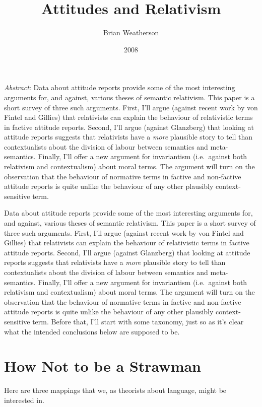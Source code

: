 \documentclass[
  11pt,
  letterpaper,
  DIV=11,
  numbers=noendperiod,
  twoside]{scrartcl}
\title{Attitudes and Relativism}
\author{Brian Weatherson}
\date{2008}
\renewenvironment{abstract}
 {\vspace{-1.25cm}
 \quotation\small\noindent\emph{Abstract}:}
 {\endquotation}
\renewenvironment{abstract}
 {\quotation\small\noindent\emph{Abstract}:}
 {\endquotation\vspace{-0.02cm}}
\begin{document}
\maketitle
\begin{abstract}
Data about attitude reports provide some of the most interesting
arguments for, and against, various theses of semantic relativism. This
paper is a short survey of three such arguments. First, I'll argue
(against recent work by von Fintel and Gillies) that relativists can
explain the behaviour of relativistic terms in factive attitude reports.
Second, I'll argue (against Glanzberg) that looking at attitude reports
suggests that relativists have a \emph{more} plausible story to tell
than contextualists about the division of labour between semantics and
meta-semantics. Finally, I'll offer a new argument for invariantism
(i.e.~against both relativism and contextualism) about moral terms. The
argument will turn on the observation that the behaviour of normative
terms in factive and non-factive attitude reports is quite unlike the
behaviour of any other plausibly context-sensitive term.
\end{abstract}


Data about attitude reports provide some of the most interesting
arguments for, and against, various theses of semantic relativism. This
paper is a short survey of three such arguments. First, I'll argue
(against recent work by von Fintel and Gillies) that relativists can
explain the behaviour of relativistic terms in factive attitude reports.
Second, I'll argue (against Glanzberg) that looking at attitude reports
suggests that relativists have a \emph{more} plausible story to tell
than contextualists about the division of labour between semantics and
meta-semantics. Finally, I'll offer a new argument for invariantism
(i.e.~against both relativism and contextualism) about moral terms. The
argument will turn on the observation that the behaviour of normative
terms in factive and non-factive attitude reports is quite unlike the
behaviour of any other plausibly context-sensitive term. Before that,
I'll start with some taxonomy, just so as it's clear what the intended
conclusions below are supposed to be.

\section{How Not to be a Strawman}\label{how-not-to-be-a-strawman}

Here are three mappings that we, as theorists about language, might be
interested in.
\end{document}

